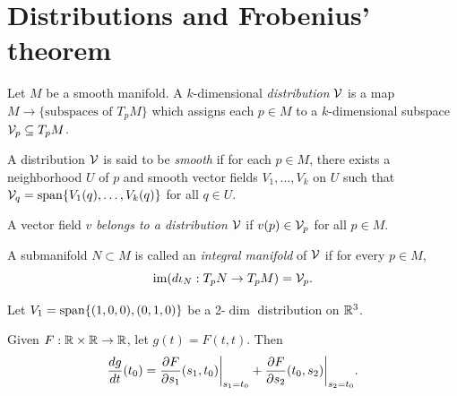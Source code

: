 \chapter{Distributions and Frobenius' theorem}

\begin{definition}
    Let \(M\) be a smooth manifold.
    A \(k\)-dimensional \emph{distribution} \(\cal{V}\) is a map \(M\to\{\text{subspaces of }T_pM\}\) which assigns each \(p\in M\) to a \(k\)-dimensional subspace \(\cal{V}_p\subseteq T_p M\).
\end{definition}

\begin{definition}
    A distribution \(\cal{V}\) is said to be \emph{smooth} if for each \(p\in M\), there exists a neighborhood \(U\) of \(p\) and smooth vector fields \(V_1,\dots,V_k\) on \(U\) such that \(\cal{V}_q = \spn\{V_1(q),\dots,V_k(q)\}\) for all \(q\in U\).
\end{definition}

\begin{definition}
    A vector field \(v\) \emph{belongs to a distribution} \(\cal{V}\) if \(v(p)\in\cal{V}_p\) for all \(p\in M\).
\end{definition}

\begin{definition}
    A submanifold \(N\subset M\) is called an \emph{integral manifold} of \(\cal{V}\) if for every \(p\in M\), \[
        \im(d\iota_N:T_pN\to T_pM) = \cal{V}_p.
    \]
\end{definition}

\begin{example}
    Let \(V_1 = \spn\{(1,0,0), (0,1,0)\}\) be a 2-\(\dim\) distribution on \(\R^3\).
    \[
        
    \]
\end{example}




\begin{lemma}
  Given \(F:\R\times\R\to\R\), let \(g(t) = F(t,t)\). Then \[
    \frac{dg}{dt}(t_0) = \frac{\pa F}{\pa s_1}(s_1,t_0)\bigg|_{s_1 = t_0} + \frac{\pa F}{\pa s_2}(t_0,s_2)\bigg|_{s_2 = t_0}.
  \]
\end{lemma}

